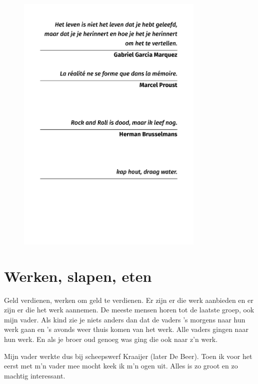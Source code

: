 \documentclass[10pt,twoside, openright]{memoir}
\begin{document}
\thispagestyle{empty}
\begin{flushright}
\begin{figure}
\includegraphics[width=0.8\textwidth, right]{img/epi/epi2}
\end{figure}
\end{flushright}

\section{Werken, slapen, eten} %
\label{cha:werkenslapen}

Geld verdienen, werken om geld te verdienen. Er zijn er die werk aanbieden en er zijn er die het werk aannemen. De meeste mensen horen tot de laatste groep, ook mijn vader. Als kind zie je niets anders dan dat de vaders ’s morgens naar hun werk gaan en ’s avonds weer thuis komen van het werk. Alle vaders gingen naar hun werk. En als je broer oud genoeg was ging die ook naar z’n werk.

Mijn vader werkte dus bij scheepswerf Kraaijer (later De Beer). Toen ik voor het eerst met m’n vader mee mocht keek ik m’n ogen uit. Alles is zo groot en zo machtig interessant.
\end{document}
